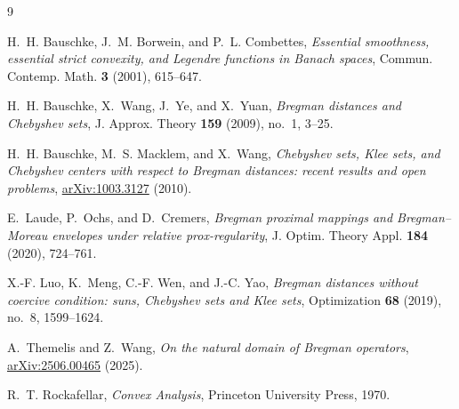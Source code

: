 \documentclass[11pt]{amsart}
\theoremstyle{plain}
\theoremstyle{definition}
\theoremstyle{remark}
\begin{document}
\begin{thebibliography}{9}

H.~H. Bauschke, J.~M. Borwein, and P.~L. Combettes,
\emph{Essential smoothness, essential strict convexity, and Legendre functions
in Banach spaces},
Commun. Contemp. Math. \textbf{3} (2001), 615--647.

H.~H. Bauschke, X.~Wang, J.~Ye, and X.~Yuan,
\emph{Bregman distances and Chebyshev sets},
J. Approx. Theory \textbf{159} (2009), no.~1, 3--25.

H.~H. Bauschke, M.~S. Macklem, and X.~Wang,
\emph{Chebyshev sets, Klee sets, and Chebyshev centers with respect to Bregman
distances: recent results and open problems},
\href{https://arxiv.org/abs/1003.3127}{arXiv:1003.3127} (2010).

E.~Laude, P.~Ochs, and D.~Cremers,
\emph{Bregman proximal mappings and Bregman--Moreau envelopes under relative
prox-regularity},
J. Optim. Theory Appl. \textbf{184} (2020), 724--761.

X.-F. Luo, K.~Meng, C.-F. Wen, and J.-C. Yao,
\emph{Bregman distances without coercive condition: suns, Chebyshev sets and
Klee sets},
Optimization \textbf{68} (2019), no.~8, 1599--1624.

A.~Themelis and Z.~Wang,
\emph{On the natural domain of Bregman operators},
\href{https://arxiv.org/abs/2506.00465}{arXiv:2506.00465} (2025).

R.~T. Rockafellar,
\emph{Convex Analysis},
Princeton University Press, 1970.

\end{thebibliography}
\end{document}

